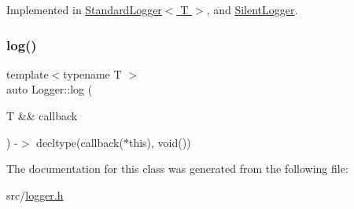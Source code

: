 Implemented in \hyperlink{class_standard_logger_af09ac6658b0c4826d1b3bd3292736184}{Standard\+Logger$<$ T $>$}, and \hyperlink{class_silent_logger_aa1b9872cb1585ec35051b3264d06aefd}{Silent\+Logger}.

\mbox{\label{class_logger_a7ea8858bb20cc869f5e6644c682292d7}} 
\subsubsection{\texorpdfstring{log()}{log()}\hspace{0.1cm}{\footnotesize\ttfamily [2/2]}}
{\footnotesize\ttfamily template$<$typename T $>$ \\
auto Logger\+::log (\begin{DoxyParamCaption}\item[{T \&\&}]{callback }\end{DoxyParamCaption}) -\/$>$ decltype(callback($\ast$this), void())
  \hspace{0.3cm}{\ttfamily [inline]}}



The documentation for this class was generated from the following file\+:\begin{DoxyCompactItemize}
\item 
src/\hyperlink{logger_8h}{logger.\+h}\end{DoxyCompactItemize}
